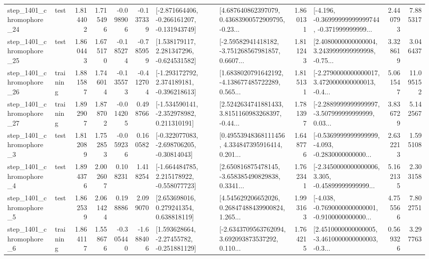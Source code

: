 \begin{tabular}{llrrrrllrlrr}
 step\_1401\_chromophore\_24 &      test &      1.814402 &    1.715496 &     -0.098906 & -0.137339 &  [-2.871664406, -0.266161207, -0.131943749] &  [4.687640862397079, 0.43683900572909795, -0.23... &       1.860131 &  [-4.196, -0.36999999999999744, -0.371999999999... &            2.440793 &          7.885317 \\
 step\_1401\_chromophore\_25 &      test &      1.860443 &    1.675170 &     -0.185274 & -0.785959 &    [1.538179117, 2.281347296, -0.624531582] &  [-2.59582941418182, -3.751268567981857, 0.6607... &       1.811243 &  [2.4080000000000004, 3.2439999999999998, -0.75... &            3.328619 &          3.046437 \\
 step\_1401\_chromophore\_26 &  training &      1.881587 &    1.746014 &     -0.135573 & -0.412704 &   [-1.293172792, 2.374189181, -0.396218613] &  [1.6838020791642192, -4.138677485722289, 0.565... &       1.815131 &  [-2.2790000000000017, 3.4720000000000013, -0.4... &            5.061547 &         11.095152 \\
 step\_1401\_chromophore\_27 &  training &      1.892907 &    1.878702 &     -0.014205 &  0.498766 &   [-1.534590141, -2.352978982, 0.211310191] &  [2.5242634741881433, 3.8151160983268397, -0.44... &       1.781397 &  [-2.2889999999999997, -3.507999999999999, 0.03... &            3.836729 &          5.142567 \\
  step\_1401\_chromophore\_3 &      test &      1.812089 &    1.752853 &     -0.059236 &  0.160582 &   [-0.322077083, -2.698706205, -0.30814043] &  [0.49553948368111456, 4.334847395916414, 0.201... &       1.648776 &  [-0.5369999999999999, -4.093, -0.2830000000000... &            2.632213 &          1.595108 \\
  step\_1401\_chromophore\_4 &      test &      1.894376 &    2.002607 &      0.108231 &  1.418254 &   [-1.664484785, 2.215178922, -0.558077723] &  [2.650816875478145, -3.658385490829838, 0.3341... &       1.762341 &  [-2.3450000000000006, 3.305, -0.45899999999999... &            5.162135 &          2.303158 \\
  step\_1401\_chromophore\_5 &      test &      1.862539 &    2.061424 &      0.198886 &  2.099070 &     [2.653698016, 0.279241354, 0.638818119] &  [4.545629206652026, 0.26847488439900824, 1.265... &       1.993163 &  [-4.038, -0.7690000000000001, -0.9100000000000... &            4.755566 &          7.802751 \\
  step\_1401\_chromophore\_6 &  training &      1.864117 &    1.558676 &     -0.305440 & -1.688406 &    [1.593628664, -2.27455782, -0.251881129] &  [-2.6343709563762094, 3.692093873537292, 0.110... &       1.764215 &  [2.4510000000000005, -3.4610000000000003, -0.3... &            0.569326 &          3.297763 \\

\end{tabular}
